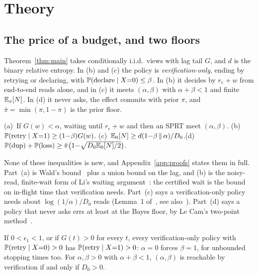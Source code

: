 \section{Theory}
\label{sec:theory}

\subsection{The price of a budget, and two floors}
\label{sec:theory-main}
Theorem~\ref{thm:main} takes conditionally i.i.d.\ views with lag tail $G$, and $d$ is the binary relative entropy. In (b) and (c) the policy is
\emph{verification-only}, ending by retrying or declaring, with $\mathbb{P}(\text{declare}\mid X{=}0)\le\beta$. In (b) it decides by $r_e{+}w$ from end-to-end reads alone,
and in (c) it meets $(\alpha,\beta)$ with $\alpha{+}\beta{<}1$ and finite $\mathbb{E}_x[N]$. In (d) it never asks, the effect commits with prior $\pi$, and $\bar\pi=\min(\pi,1{-}\pi)$ is the prior floor.

\begin{theorem}
\label{thm:main}
(a)~If $G(w){<}\alpha$, waiting until $r_e{+}w$ and then an SPRT meet $(\alpha,\beta)$. (b)~$\mathbb{P}(\text{retry}\mid X{=}1)\ge(1{-}\beta)G(w)$.
(c)~$\mathbb{E}_0[N]\ge d(1{-}\beta\,\|\,\alpha)/D_0$.\newline (d)~$\mathbb{P}(\mathrm{dup})+\mathbb{P}(\mathrm{loss})\ge\bar\pi\big(1{-}\sqrt{D_0\mathbb{E}_0[N]/2}\big)$.
\end{theorem}

None of these inequalities is new, and Appendix~\ref{app:proofs} states them in full. Part~(a) is Wald's bound~\cite{wald1945sprt} plus a union bound on
the lag, and (b) is the noisy-read, finite-wait form of Li's waiting argument~\cite{li2026exactlyonce}: the certified wait is the bound on in-flight time that verification needs. Part~(c) says a verification-only policy needs about $\log(1/\alpha)/D_0$ reads
(Lemma~1 of~\cite{kaufmann2016complexity}, see also~\cite{tartakovsky2014sequential}). Part~(d) says a policy that never asks errs at least at the Bayes floor, by Le Cam's
two-point method~\cite{tsybakov2009nonparametric}.

\begin{corollary}
\label{cor:notfree}
If $0<\epsilon_1<1$, or if $G(t)>0$ for every $t$, every verification-only policy with $\mathbb{P}(\text{retry}\mid X{=}0)>0$ has $\mathbb{P}(\text{retry}\mid X{=}1)>0$: $\alpha=0$ forces $\beta=1$,
for unbounded stopping times too. For $\alpha,\beta>0$ with $\alpha+\beta<1$, $(\alpha,\beta)$ is reachable by verification if and only if $D_0>0$.
\end{corollary}

